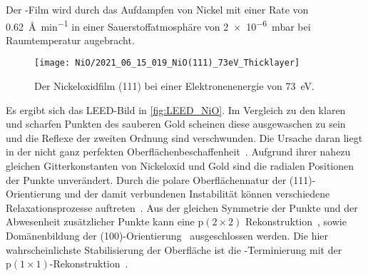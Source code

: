         Der -Film wird durch das Aufdampfen von Nickel mit einer Rate von \SI{0.62}{\angstrom\per\minute} in einer Sauerstoffatmosphäre von \SI{2e-6}{\milli\bar} bei Raumtemperatur augebracht.
        \begin{figure}
            \centering
            \texttt{[image: NiO/2021\_06\_15\_019\_NiO(111)\_73eV\_Thicklayer]}
            \caption{Der Nickeloxidfilm (111) bei einer Elektronenenergie von \SI{73}{\electronvolt}.}
            \label{fig:LEED_NiO}
        \end{figure}
        Es ergibt sich das LEED-Bild in \autoref{fig:LEED_NiO}.
        Im Vergleich zu den klaren und scharfen Punkten des sauberen Gold scheinen diese ausgewaschen zu sein und die Reflexe der zweiten Ordnung sind verschwunden.
        Die Ursache daran liegt in der nicht ganz perfekten Oberflächenbeschaffenheit~\cite{NiO_34}.
        Aufgrund ihrer nahezu gleichen Gitterkonstanten von Nickeloxid und Gold sind die radialen Positionen der Punkte unverändert.
        Durch die polare Oberflächennatur der (111)-Orientierung und der damit verbundenen Instabilität können verschiedene Relaxationsprozesse auftreten~\cite{NiO_36, NiO_35, NiO_34, NiO_27, NiO_10}.
        Aus der gleichen Symmetrie der Punkte und der Abwesenheit zusätzlicher Punkte kann eine $\text{p}(2 \times 2)$ Rekonstruktion~\cite{NiO_37}, sowie Domänenbildung der (100)-Orientierung~\cite{NiO_36} ausgeschlossen werden.
        Die hier wahrscheinlichste Stabilisierung der Oberfläche ist die -Terminierung mit der $\text{p}(1 \times 1)$-Rekonstruktion~\cite{NiO_35}.

